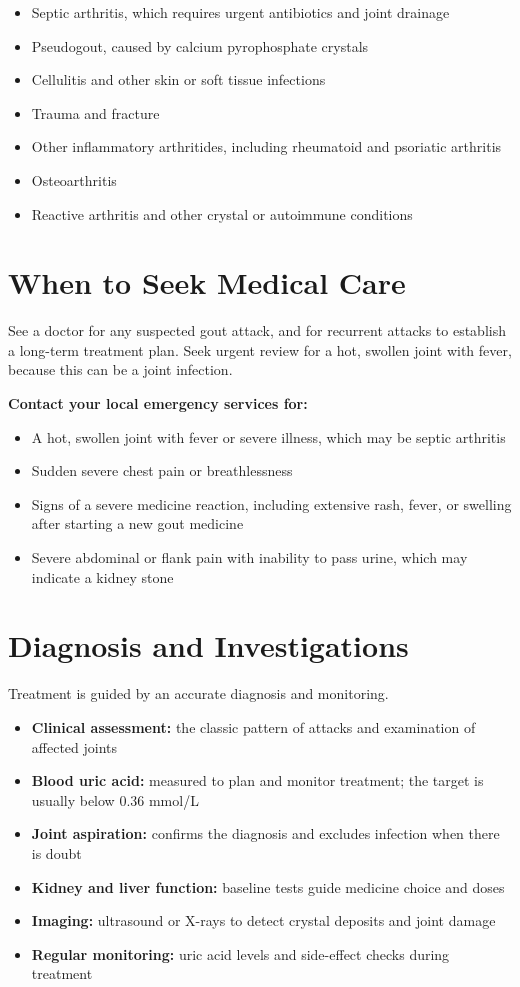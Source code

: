 \begin{itemize}
    \item Septic arthritis, which requires urgent antibiotics and joint drainage
    \item Pseudogout, caused by calcium pyrophosphate crystals
    \item Cellulitis and other skin or soft tissue infections
    \item Trauma and fracture
    \item Other inflammatory arthritides, including rheumatoid and psoriatic arthritis
    \item Osteoarthritis
    \item Reactive arthritis and other crystal or autoimmune conditions
\end{itemize}

\section*{When to Seek Medical Care}
See a doctor for any suspected gout attack, and for recurrent attacks to establish a long-term treatment plan. Seek urgent review for a hot, swollen joint with fever, because this can be a joint infection.

\textbf{Contact your local emergency services for:}
\begin{itemize}
    \item A hot, swollen joint with fever or severe illness, which may be septic arthritis
    \item Sudden severe chest pain or breathlessness
    \item Signs of a severe medicine reaction, including extensive rash, fever, or swelling after starting a new gout medicine
    \item Severe abdominal or flank pain with inability to pass urine, which may indicate a kidney stone
\end{itemize}

\section*{Diagnosis and Investigations}
Treatment is guided by an accurate diagnosis and monitoring.

\begin{itemize}
    \item \textbf{Clinical assessment:} the classic pattern of attacks and examination of affected joints
    \item \textbf{Blood uric acid:} measured to plan and monitor treatment; the target is usually below 0.36 mmol/L
    \item \textbf{Joint aspiration:} confirms the diagnosis and excludes infection when there is doubt
    \item \textbf{Kidney and liver function:} baseline tests guide medicine choice and doses
    \item \textbf{Imaging:} ultrasound or X-rays to detect crystal deposits and joint damage
    \item \textbf{Regular monitoring:} uric acid levels and side-effect checks during treatment
\end{itemize}

